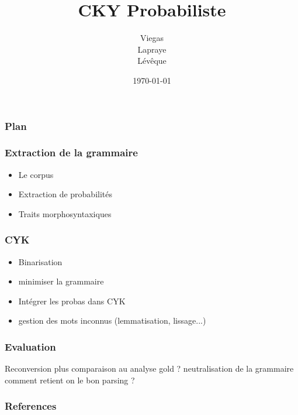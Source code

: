 \documentclass{beamer}
\begin{document}
\title{CKY Probabiliste}  %
\author{Viegas\\Lapraye\\Lévêque}

\date{\today}


\begin{frame}
 \maketitle
\end{frame}



\begin{frame} %
\frametitle{Plan}
\end{frame}

\begin{frame}
\frametitle{Extraction de la grammaire}

\begin{itemize}
 \item<1-3> Le corpus
 \item<2-3> Extraction de probabilités
 \item<3-3> Traits morphosyntaxiques
\end{itemize}

 
\end{frame}

\begin{frame}
 \frametitle{CYK}
 \begin{itemize}
  \item<1-4> Binarisation 
  \item<2-4> minimiser la grammaire 
  \item<3-4> Intégrer les probas dans CYK
  \item<4> gestion des mots inconnus (lemmatisation, lissage...)
 
 \end{itemize}

 
\end{frame}

\begin{frame}
\frametitle{Evaluation}
 Reconversion plus comparaison au analyse gold
? neutralisation de la grammaire
comment retient on le bon parsing ?
\end{frame}



\begin{frame}[allowframebreaks]
        \frametitle{References}
\end{frame}

%
%
%
%
%
%
\end{document}
